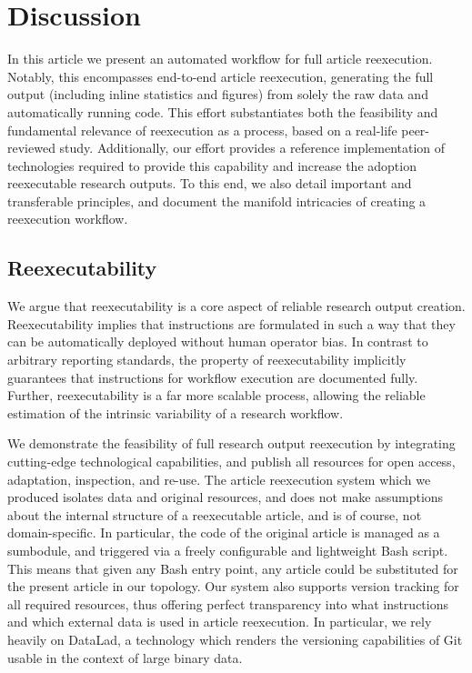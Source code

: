 \section{Discussion}

In this article we present an automated workflow for full article reexecution.
Notably, this encompasses end-to-end article reexecution, generating the full output (including inline statistics and figures) from solely the raw data and automatically running code.
This effort substantiates both the feasibility and fundamental relevance of reexecution as a process, based on a real-life peer-reviewed study.
Additionally, our effort provides a reference implementation of technologies required to provide this capability and increase the adoption reexecutable research outputs.
To this end, we also detail important and transferable principles, and document the manifold intricacies of creating a reexecution workflow.

\subsection{Reexecutability}
We argue that reexecutability is a core aspect of reliable research output creation.
Reexecutability implies that instructions are formulated in such a way that they can be automatically deployed without human operator bias.
In contrast to arbitrary reporting standards, the property of reexecutability implicitly guarantees that instructions for workflow execution are documented fully.
Further, reexecutability is a far more scalable process, allowing the reliable estimation of the intrinsic variability of a research workflow.

We demonstrate the feasibility of full research output reexecution by integrating cutting-edge technological capabilities, and publish all resources for open access, adaptation, inspection, and re-use.
The article reexecution system which we produced isolates data and original resources, and does not make assumptions about the internal structure of a reexecutable article, and is of course, not domain-specific.
In particular, the code of the original article is managed as a sumbodule, and triggered via a freely configurable and lightweight Bash script.
This means that given any Bash entry point, any article could be substituted for the present article in our topology.
Our system also supports version tracking for all required resources, thus offering perfect transparency into what instructions and which external data is used in article reexecution.
In particular, we rely heavily on DataLad, a technology which renders the versioning capabilities of Git usable in the context of large binary data.

